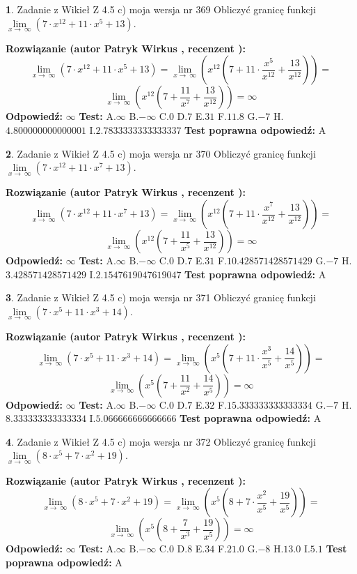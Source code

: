 \documentclass[12pt, a4paper]{article}
\theoremstyle{definition} %
\newtheorem{zad}{}
\newcommand{\zadStart}[1]{\begin{zad}#1\newline}
\newcommand{\zadStop}{\end{zad}}
\newcommand{\rozwStart}[2]{\noindent \textbf{Rozwiązanie (autor #1 , recenzent #2): }\newline}
\newcommand{\rozwStop}{\newline}
\newcommand{\odpStart}{\noindent \textbf{Odpowiedź:}\newline}
\newcommand{\odpStop}{\newline}
\newcommand{\testStart}{\noindent \textbf{Test:}\newline}
\newcommand{\testStop}{\newline}
\newcommand{\kluczStart}{\noindent \textbf{Test poprawna odpowiedź:}\newline}
\newcommand{\kluczStop}{\newline}
\begin{document}
\zadStart{Zadanie z Wikieł Z 4.5 c) moja wersja nr 369}
Obliczyć granicę funkcji  $\lim\limits_{x\to\ \infty}(7 \cdot x^{12}+11 \cdot x^{5}+13)$.
\zadStop
\rozwStart{Patryk Wirkus}{}
$$\lim\limits_{x\to\ \infty}(7 \cdot x^{12}+11 \cdot x^{5}+13) = \lim\limits_{x\to\ \infty}(x^{12}(7 +11 \cdot \frac{x^{5}}{x^{12}}+\frac{13}{x^{12}})) =$$ $$\lim\limits_{x\to\ \infty}(x^{12}(7 +\frac{11}{x^{7}}+\frac{13}{x^{12}})) =\infty$$
\rozwStop
\odpStart
$\infty$
\odpStop
\testStart
A.$\infty$ B.$-\infty$ C.$0$ D.$7$ E.$31$
F.$11.8$ G.$-7$
H.$4.800000000000001$
I.$2.7833333333333337$
\testStop
\kluczStart
A
\kluczStop



\zadStart{Zadanie z Wikieł Z 4.5 c) moja wersja nr 370}
Obliczyć granicę funkcji  $\lim\limits_{x\to\ \infty}(7 \cdot x^{12}+11 \cdot x^{7}+13)$.
\zadStop
\rozwStart{Patryk Wirkus}{}
$$\lim\limits_{x\to\ \infty}(7 \cdot x^{12}+11 \cdot x^{7}+13) = \lim\limits_{x\to\ \infty}(x^{12}(7 +11 \cdot \frac{x^{7}}{x^{12}}+\frac{13}{x^{12}})) =$$ $$\lim\limits_{x\to\ \infty}(x^{12}(7 +\frac{11}{x^{5}}+\frac{13}{x^{12}})) =\infty$$
\rozwStop
\odpStart
$\infty$
\odpStop
\testStart
A.$\infty$ B.$-\infty$ C.$0$ D.$7$ E.$31$
F.$10.428571428571429$ G.$-7$
H.$3.428571428571429$
I.$2.1547619047619047$
\testStop
\kluczStart
A
\kluczStop



\zadStart{Zadanie z Wikieł Z 4.5 c) moja wersja nr 371}
Obliczyć granicę funkcji  $\lim\limits_{x\to\ \infty}(7 \cdot x^{5}+11 \cdot x^{3}+14)$.
\zadStop
\rozwStart{Patryk Wirkus}{}
$$\lim\limits_{x\to\ \infty}(7 \cdot x^{5}+11 \cdot x^{3}+14) = \lim\limits_{x\to\ \infty}(x^{5}(7 +11 \cdot \frac{x^{3}}{x^{5}}+\frac{14}{x^{5}})) =$$ $$\lim\limits_{x\to\ \infty}(x^{5}(7 +\frac{11}{x^{2}}+\frac{14}{x^{5}})) =\infty$$
\rozwStop
\odpStart
$\infty$
\odpStop
\testStart
A.$\infty$ B.$-\infty$ C.$0$ D.$7$ E.$32$
F.$15.333333333333334$ G.$-7$
H.$8.333333333333334$
I.$5.066666666666666$
\testStop
\kluczStart
A
\kluczStop



\zadStart{Zadanie z Wikieł Z 4.5 c) moja wersja nr 372}
Obliczyć granicę funkcji  $\lim\limits_{x\to\ \infty}(8 \cdot x^{5}+7 \cdot x^{2}+19)$.
\zadStop
\rozwStart{Patryk Wirkus}{}
$$\lim\limits_{x\to\ \infty}(8 \cdot x^{5}+7 \cdot x^{2}+19) = \lim\limits_{x\to\ \infty}(x^{5}(8 +7 \cdot \frac{x^{2}}{x^{5}}+\frac{19}{x^{5}})) =$$ $$\lim\limits_{x\to\ \infty}(x^{5}(8 +\frac{7}{x^{3}}+\frac{19}{x^{5}})) =\infty$$
\rozwStop
\odpStart
$\infty$
\odpStop
\testStart
A.$\infty$ B.$-\infty$ C.$0$ D.$8$ E.$34$
F.$21.0$ G.$-8$
H.$13.0$
I.$5.1$
\testStop
\kluczStart
A
\kluczStop
\end{document}
